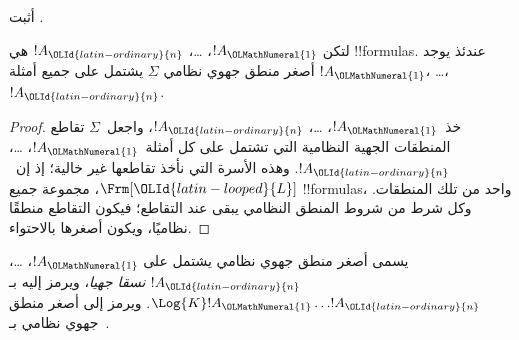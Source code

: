 \documentclass[../../../include/open-logic-section]{subfiles}
\begin{document}
\begin{prob}
  أثبت .
\end{prob}

\begin{prop}
  لتكن $!A_{\OLMathNumeral{1}}$، \dots، $!A_{\OLId{latin-ordinary}{n}}$ هي !!{formula}s. عندئذ يوجد أصغر
  منطق جهوي نظامي $\Sigma$ يشتمل على جميع أمثلة $!A_{\OLMathNumeral{1}}$، \dots، $!A_{\OLId{latin-ordinary}{n}}$.
\end{prop}

\begin{proof}
  خذ~$!A_{\OLMathNumeral{1}}$، \dots، $!A_{\OLId{latin-ordinary}{n}}$، واجعل~$\Sigma$ تقاطع المنطقات
  الجهية النظامية التي تشتمل على كل أمثلة~$!A_{\OLMathNumeral{1}}$، \dots، $!A_{\OLId{latin-ordinary}{n}}$.
  وهذه الأسرة التي نأخذ تقاطعها غير خالية؛ إذ إن~$\Frm[{\OLId{latin-looped}{L}}]$،
  مجموعة جميع !!{formula}s، واحد من تلك المنطقات.
  وكل شرط من شروط المنطق النظامي يبقى عند التقاطع؛ فيكون التقاطع
  منطقًا نظاميًا، ويكون أصغرها بالاحتواء.
\end{proof}

\begin{defn}
يسمى أصغر منطق جهوي نظامي يشتمل على $!A_{\OLMathNumeral{1}}$، \dots، $!A_{\OLId{latin-ordinary}{n}}$
\emph{نسقا جهيا}، ويرمز إليه بـ$\Log{K} !A_{\OLMathNumeral{1}} \dots
!A_{\OLId{latin-ordinary}{n}}$. ويرمز إلى أصغر منطق جهوي نظامي بـ~.
\end{defn}
\end{document}
